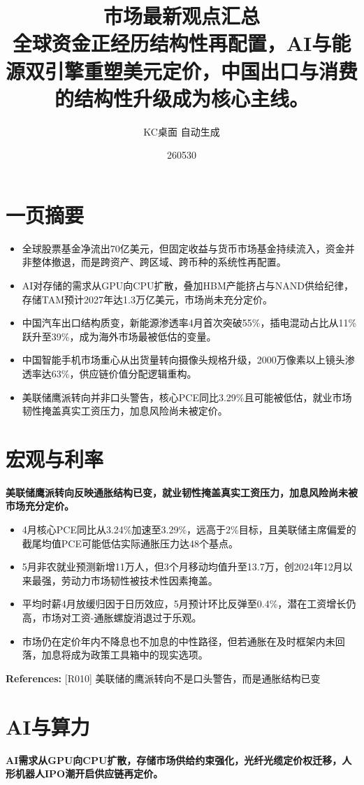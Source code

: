 \documentclass[11pt]{ctexart}
\title{\textbf{市场最新观点汇总}\\[0.4em]{\large 全球资金正经历结构性再配置，AI与能源双引擎重塑美元定价，中国出口与消费的结构性升级成为核心主线。}}
\author{KC桌面 自动生成}
\date{260530}
\begin{document}
\maketitle
\section*{一页摘要}
\begin{itemize}
  \item 全球股票基金净流出70亿美元，但固定收益与货币市场基金持续流入，资金并非整体撤退，而是跨资产、跨区域、跨币种的系统性再配置。
  \item AI对存储的需求从GPU向CPU扩散，叠加HBM产能挤占与NAND供给纪律，存储TAM预计2027年达1.3万亿美元，市场尚未充分定价。
  \item 中国汽车出口结构质变，新能源渗透率4月首次突破55\%，插电混动占比从11\%跃升至39\%，成为海外市场最被低估的变量。
  \item 中国智能手机市场重心从出货量转向摄像头规格升级，2000万像素以上镜头渗透率达63\%，供应链价值分配逻辑重构。
  \item 美联储鹰派转向并非口头警告，核心PCE同比3.29\%且可能被低估，就业市场韧性掩盖真实工资压力，加息风险尚未被定价。
\end{itemize}
\section{宏观与利率}
\textbf{美联储鹰派转向反映通胀结构已变，就业韧性掩盖真实工资压力，加息风险尚未被市场充分定价。}

\begin{itemize}
  \item 4月核心PCE同比从3.24\%加速至3.29\%，远高于2\%目标，且美联储主席偏爱的截尾均值PCE可能低估实际通胀压力达48个基点。
  \item 5月非农就业预测新增11万人，但3个月移动均值升至13.7万，创2024年12月以来最强，劳动力市场韧性被技术性因素掩盖。
  \item 平均时薪4月放缓归因于日历效应，5月预计环比反弹至0.4\%，潜在工资增长仍高，市场对工资-通胀螺旋消退过于乐观。
  \item 市场仍在定价年内不降息也不加息的中性路径，但若通胀在及时框架内未回落，加息将成为政策工具箱中的现实选项。
\end{itemize}
{\small\color{refgray}\textbf{References:} [R010] 美联储的鹰派转向不是口头警告，而是通胀结构已变}

\section{AI与算力}
\textbf{AI需求从GPU向CPU扩散，存储市场供给约束强化，光纤光缆定价权迁移，人形机器人IPO潮开启供应链再定价。}
\end{document}
